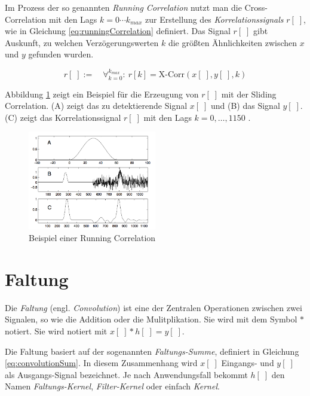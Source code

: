 Im Prozess der so genannten \emph{Running Correlation} nutzt man die Cross-Correlation mit den Lags $k = 0 \cdots k_{max}$ zur Erstellung des \emph{Korrelationssignals} $r[\;]$, wie in Gleichung \ref{eq:runningCorrelation} definiert. Das Signal $r[\;]$ gibt Auskunft, zu welchen Verzögerungswerten $k$ die größten Ähnlichkeiten zwischen $x$ und $y$ gefunden wurden. 

\begin{equation}
r[\;] := \quad \mathop{\forall}_{k = 0}^{k_{max}} :\ r[k] = \text{X-Corr}(x[\;],y[\;],k)
\label{eq:runningCorrelation}
\end{equation}

Abbildung \ref{img:slidingCorrelation} zeigt ein Beispiel für die Erzeugung von $r[\;]$ mit der Sliding Correlation. (A) zeigt das zu detektierende Signal $x[\;]$ und (B) das Signal $y[\;]$. (C) zeigt das Korrelationssignal $r[\;]$ mit den Lags $k = 0, \ldots ,1150$ . \cite[S. 47 - 48]{dspMichigan}

\begin{figure}[h]
	\centering
	\includegraphics[width=0.5\textwidth]{bilder/slidingCorrelation.png}
	\caption{Beispiel einer Running Correlation}
	\label{img:slidingCorrelation}
\end{figure}

\section{Faltung}

Die \emph{Faltung} (engl. \emph{Convolution}) ist eine der Zentralen Operationen zwischen zwei Signalen, so wie die Addition oder die Mulitplikation. Sie wird mit dem Symbol $*$ notiert. Sie wird notiert mit $x[\;]* h[\;] = y[\;]$. 

Die Faltung basiert auf der sogenannten \emph{Faltungs-Summe}, definiert in Gleichung \ref{eq:convolutionSum}. In diesem Zusammenhang wird $x[\;]$ Eingangs- und $y[\;]$ als Ausgangs-Signal bezeichnet. Je nach Anwendungsfall bekommt $h[\;]$ den Namen \emph{Faltungs-Kernel}, \emph{Filter-Kernel} oder einfach \emph{Kernel}. \cite[S. 107-108]{dspGuide}

